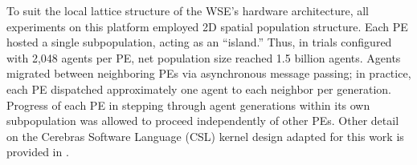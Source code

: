 
To suit the local lattice structure of the WSE's hardware architecture, all experiments on this platform employed 2D spatial population structure.
Each PE hosted a single subpopulation, acting as an ``island.''
Thus, in trials configured with 2,048 agents per PE, net population size reached 1.5 billion agents.
Agents migrated between neighboring PEs via asynchronous message passing;
in practice, each PE dispatched approximately one agent to each neighbor per generation.
Progress of each PE in stepping through agent generations within its own subpopulation was allowed to proceed independently of other PEs.
Other detail on the Cerebras Software Language (CSL) kernel design adapted for this work is provided in \cite{moreno2024trackable}.




